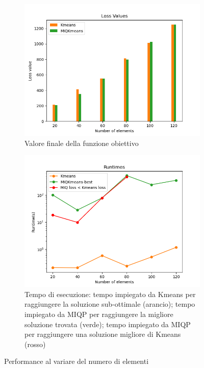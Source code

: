 \documentclass{article}
\begin{document}
    \begin{figure}[H]
     \centering
     \begin{subfigure}[t]{0.49\linewidth}
         \centering
         \includegraphics[width=\linewidth]{../results/log_plots/loss_size_heart}
         \caption{Valore finale della funzione obiettivo}
     \end{subfigure}
     \hfill
     \begin{subfigure}[t]{0.48\linewidth}
         \centering
         \includegraphics[width=\linewidth]{../results/log_plots/runtime_size_heart_log}
         \caption{Tempo di esecuzione: tempo impiegato da Kmeans per raggiungere la soluzione sub-ottimale (arancio); tempo impiegato da MIQP per raggiungere la migliore soluzione trovata (verde); tempo impiegato da MIQP per raggiungere una soluzione migliore di Kmeans (rosso)}
     \end{subfigure}
        \caption{Performance al variare del numero di elementi}
        \label{fig:size_real}
     \end{figure}
\end{document}
